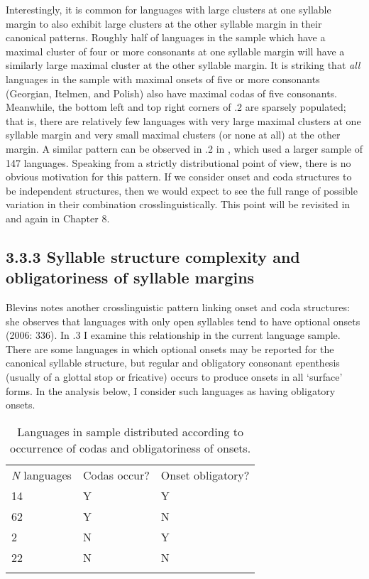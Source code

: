   Interestingly, it is common for languages with large clusters at one syllable margin to also exhibit large clusters at the other syllable margin in their canonical patterns. Roughly half of languages in the sample which have a maximal cluster of four or more consonants at one syllable margin will have a similarly large maximal cluster at the other syllable margin. It is striking that \textit{all} languages in the sample with maximal onsets of five or more consonants (Georgian, Itelmen, and Polish) also have maximal codas of five consonants. Meanwhile, the bottom left and top right corners of .2 are sparsely populated; that is, there are relatively few languages with very large maximal clusters at one syllable margin and very small maximal clusters (or none at all) at the other margin. A similar pattern can be observed in .2 in , which used a larger sample of 147 languages. Speaking from a strictly distributional point of view, there is no obvious motivation for this pattern. If we consider onset and coda structures to be independent structures, then we would expect to see the full range of possible variation in their combination crosslinguistically. This point will be revisited in  and again in Chapter 8.

\subsection{3.3.3 Syllable structure complexity and obligatoriness of syllable margins}

  Blevins notes another crosslinguistic pattern linking onset and coda structures: she observes that languages with only open syllables tend to have optional onsets (2006: 336). In .3 I examine this relationship in the current language sample. There are some languages in which optional onsets may be reported for the canonical syllable structure, but regular and obligatory consonant epenthesis (usually of a glottal stop or fricative) occurs to produce onsets in all ‘surface’ forms. In the analysis below, I consider such languages as having obligatory onsets.

\begin{table}
\begin{tabularx}{\textwidth}{XXX}
\lsptoprule

 \textit{N} languages & Codas occur? & Onset obligatory?\\
 14 & Y & Y\\
 62 & Y & N\\
 2 & N & Y\\
 22 & N & N\\
\lspbottomrule
\end{tabularx}
\caption{\label{3.3}Languages in sample distributed according to occurrence of codas and obligatoriness of onsets.}
\end{table}

